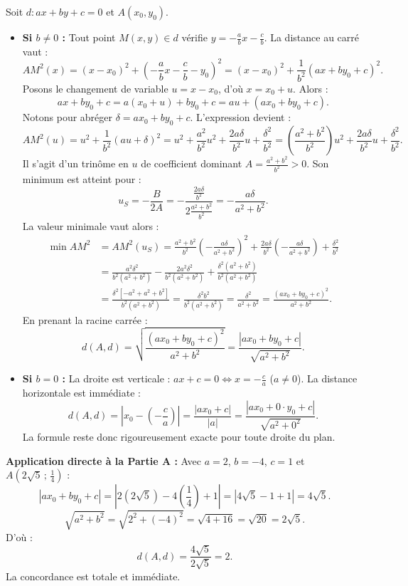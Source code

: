 \documentclass[11pt,a4paper]{article}
\begin{document}
\begin{correctionbox}
Soit $d : ax + by + c = 0$ et $A(x_0, y_0)$.
\begin{itemize}[leftmargin=1cm]
    \item \textbf{Si $b \neq 0$ :} Tout point $M(x, y) \in d$ vérifie $y = -\frac{a}{b}x - \frac{c}{b}$.
    La distance au carré vaut :
    \[
    AM^2(x) = (x - x_0)^2 + \left(-\frac{a}{b}x - \frac{c}{b} - y_0\right)^2 = (x - x_0)^2 + \frac{1}{b^2}(ax + by_0 + c)^2.
    \]
    Posons le changement de variable $u = x - x_0$, d'où $x = x_0 + u$. Alors :
    \[
    ax + by_0 + c = a(x_0 + u) + by_0 + c = a u + (a x_0 + b y_0 + c).
    \]
    Notons pour abréger $\delta = a x_0 + b y_0 + c$. L'expression devient :
    \[
    AM^2(u) = u^2 + \frac{1}{b^2}(au + \delta)^2 = u^2 + \frac{a^2}{b^2}u^2 + \frac{2a\delta}{b^2}u + \frac{\delta^2}{b^2} = \left(\frac{a^2+b^2}{b^2}\right)u^2 + \frac{2a\delta}{b^2}u + \frac{\delta^2}{b^2}.
    \]
    Il s'agit d'un trinôme en $u$ de coefficient dominant $A = \frac{a^2+b^2}{b^2} > 0$. Son minimum est atteint pour :
    \[
    u_S = -\frac{B}{2A} = -\frac{\frac{2a\delta}{b^2}}{2\frac{a^2+b^2}{b^2}} = -\frac{a\delta}{a^2+b^2}.
    \]
    La valeur minimale vaut alors :
    \begin{align*}
    \min AM^2 &= AM^2(u_S) = \frac{a^2+b^2}{b^2}\left(-\frac{a\delta}{a^2+b^2}\right)^2 + \frac{2a\delta}{b^2}\left(-\frac{a\delta}{a^2+b^2}\right) + \frac{\delta^2}{b^2} \\
    &= \frac{a^2\delta^2}{b^2(a^2+b^2)} - \frac{2a^2\delta^2}{b^2(a^2+b^2)} + \frac{\delta^2(a^2+b^2)}{b^2(a^2+b^2)} \\
    &= \frac{\delta^2[-a^2 + a^2 + b^2]}{b^2(a^2+b^2)} = \frac{\delta^2 b^2}{b^2(a^2+b^2)} = \frac{\delta^2}{a^2 + b^2} = \frac{(ax_0 + by_0 + c)^2}{a^2 + b^2}.
    \end{align*}
    En prenant la racine carrée :
    \[
    d(A, d) = \sqrt{\frac{(ax_0 + by_0 + c)^2}{a^2 + b^2}} = \frac{|ax_0 + by_0 + c|}{\sqrt{a^2 + b^2}}.
    \]
    \item \textbf{Si $b = 0$ :} La droite est verticale : $ax + c = 0 \iff x = -\frac{c}{a}$ ($a \neq 0$).
    La distance horizontale est immédiate :
    \[
    d(A, d) = \left|x_0 - \left(-\frac{c}{a}\right)\right| = \frac{|ax_0 + c|}{|a|} = \frac{|ax_0 + 0 \cdot y_0 + c|}{\sqrt{a^2 + 0^2}}.
    \]
    La formule reste donc rigoureusement exacte pour toute droite du plan.
\end{itemize}

\textbf{Application directe à la Partie A :}
Avec $a = 2$, $b = -4$, $c = 1$ et $A\left(2\sqrt{5} \,;\, \frac{1}{4}\right)$ :
\[
|a x_0 + b y_0 + c| = \left| 2(2\sqrt{5}) - 4\left(\frac{1}{4}\right) + 1 \right| = |4\sqrt{5} - 1 + 1| = 4\sqrt{5}.
\]
\[
\sqrt{a^2 + b^2} = \sqrt{2^2 + (-4)^2} = \sqrt{4 + 16} = \sqrt{20} = 2\sqrt{5}.
\]
D'où :
\[
d(A, d) = \frac{4\sqrt{5}}{2\sqrt{5}} = 2.
\]
La concordance est totale et immédiate.
\end{correctionbox}
\end{document}
